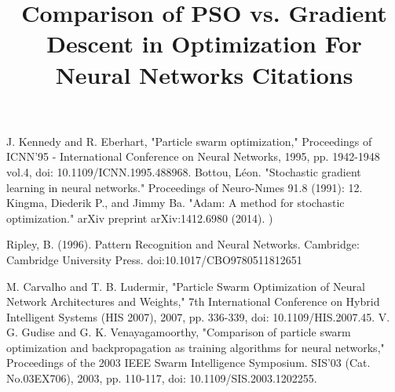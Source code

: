 \documentclass[conference]{IEEEtran}
\begin{document}
\title{Comparison of PSO vs. Gradient Descent in Optimization For Neural Networks Citations}

\author{
}

\maketitle


\begin{thebibliography}{00}


 J. Kennedy and R. Eberhart, "Particle swarm optimization," Proceedings of ICNN'95 - International Conference on Neural Networks, 1995, pp. 1942-1948 vol.4, doi: 10.1109/ICNN.1995.488968.
 Bottou, Léon. "Stochastic gradient learning in neural networks." Proceedings of Neuro-Nımes 91.8 (1991): 12.
 Kingma, Diederik P., and Jimmy Ba. "Adam: A method for stochastic optimization." arXiv preprint arXiv:1412.6980 (2014).
)

 Ripley, B. (1996). Pattern Recognition and Neural Networks. Cambridge: Cambridge University Press. doi:10.1017/CBO9780511812651


 M. Carvalho and T. B. Ludermir, "Particle Swarm Optimization of Neural Network Architectures and Weights," 7th International Conference on Hybrid Intelligent Systems (HIS 2007), 2007, pp. 336-339, doi: 10.1109/HIS.2007.45.
 V. G. Gudise and G. K. Venayagamoorthy, "Comparison of particle swarm optimization and backpropagation as training algorithms for neural networks," Proceedings of the 2003 IEEE Swarm Intelligence Symposium. SIS'03 (Cat. No.03EX706), 2003, pp. 110-117, doi: 10.1109/SIS.2003.1202255.


\end{thebibliography}
\end{document}

